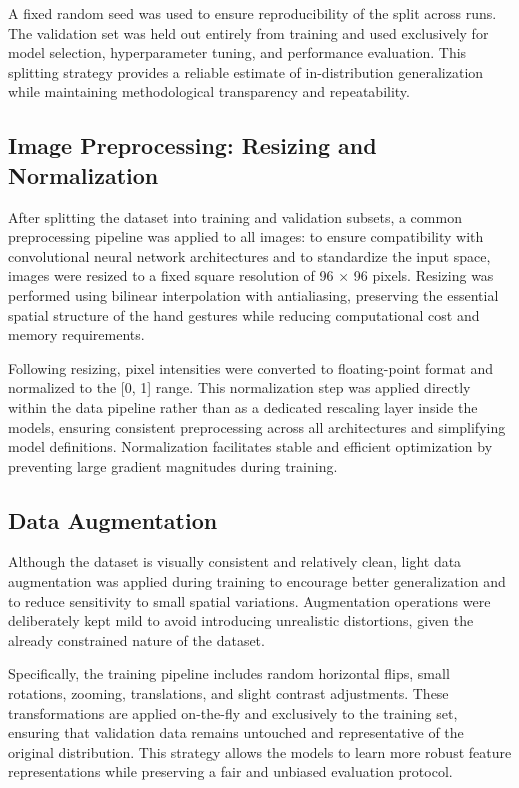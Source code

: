 \documentclass{article}
\begin{document}
A fixed random seed was used to ensure reproducibility of the split
across runs. The validation set was held out entirely from training and
used exclusively for model selection, hyperparameter tuning, and
performance evaluation. This splitting strategy provides a reliable
estimate of in-distribution generalization while maintaining
methodological transparency and repeatability.

\subsection{Image Preprocessing: Resizing and Normalization}

After splitting the dataset into training and validation subsets, a
common preprocessing pipeline was applied to all images: to ensure compatibility with convolutional neural network architectures
and to standardize the input space, images were resized to a fixed
square resolution of 96 × 96 pixels. Resizing was performed using
bilinear interpolation with antialiasing, preserving the essential
spatial structure of the hand gestures while reducing computational cost
and memory requirements.

Following resizing, pixel intensities were converted to floating-point
format and normalized to the {[}0, 1{]} range. This normalization step
was applied directly within the data pipeline rather than as a dedicated
rescaling layer inside the models, ensuring consistent preprocessing
across all architectures and simplifying model definitions.
Normalization facilitates stable and efficient optimization by
preventing large gradient magnitudes during training.

\subsection{Data Augmentation}

Although the dataset is visually consistent and relatively clean, light
data augmentation was applied during training to encourage better
generalization and to reduce sensitivity to small spatial variations.
Augmentation operations were deliberately kept mild to avoid introducing
unrealistic distortions, given the already constrained nature of the
dataset.

Specifically, the training pipeline includes random horizontal flips,
small rotations, zooming, translations, and slight contrast adjustments.
These transformations are applied on-the-fly and exclusively to the
training set, ensuring that validation data remains untouched and
representative of the original distribution. This strategy allows the
models to learn more robust feature representations while preserving a
fair and unbiased evaluation protocol.
\end{document}
